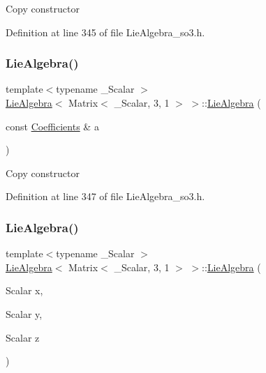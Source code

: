 Copy constructor 

Definition at line 345 of file Lie\+Algebra\+\_\+so3.\+h.

\hypertarget{class_lie_algebra_3_01_matrix_3_01___scalar_00_013_00_011_01_4_01_4_af105615d1bcc3d5518841493983ee453}{}\label{class_lie_algebra_3_01_matrix_3_01___scalar_00_013_00_011_01_4_01_4_af105615d1bcc3d5518841493983ee453} 
\subsubsection{\texorpdfstring{Lie\+Algebra()}{LieAlgebra()}\hspace{0.1cm}{\footnotesize\ttfamily [4/5]}}
{\footnotesize\ttfamily template$<$typename \+\_\+\+Scalar $>$ \\
\hyperlink{class_lie_algebra}{Lie\+Algebra}$<$ Matrix$<$ \+\_\+\+Scalar, 3, 1 $>$ $>$\+::\hyperlink{class_lie_algebra}{Lie\+Algebra} (\begin{DoxyParamCaption}\item[{const \hyperlink{class_lie_algebra_3_01_matrix_3_01___scalar_00_013_00_011_01_4_01_4_a028504a0d794d492dc47b2edd056fe47}{Coefficients} \&}]{a }\end{DoxyParamCaption})\hspace{0.3cm}{\ttfamily [inline]}}

Copy constructor 

Definition at line 347 of file Lie\+Algebra\+\_\+so3.\+h.

\hypertarget{class_lie_algebra_3_01_matrix_3_01___scalar_00_013_00_011_01_4_01_4_a3407ec51785ed5f605f4e56f6fd6df1c}{}\label{class_lie_algebra_3_01_matrix_3_01___scalar_00_013_00_011_01_4_01_4_a3407ec51785ed5f605f4e56f6fd6df1c} 
\subsubsection{\texorpdfstring{Lie\+Algebra()}{LieAlgebra()}\hspace{0.1cm}{\footnotesize\ttfamily [5/5]}}
{\footnotesize\ttfamily template$<$typename \+\_\+\+Scalar $>$ \\
\hyperlink{class_lie_algebra}{Lie\+Algebra}$<$ Matrix$<$ \+\_\+\+Scalar, 3, 1 $>$ $>$\+::\hyperlink{class_lie_algebra}{Lie\+Algebra} (\begin{DoxyParamCaption}\item[{Scalar}]{x,  }\item[{Scalar}]{y,  }\item[{Scalar}]{z }\end{DoxyParamCaption})\hspace{0.3cm}{\ttfamily [inline]}}

